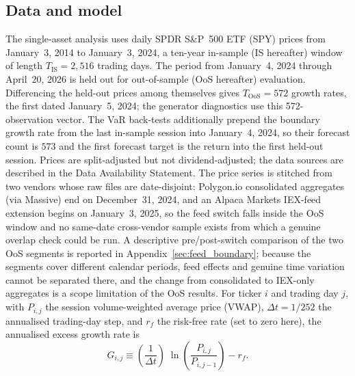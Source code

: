 \subsection{Data and model}
\label{sec:data_and_model}

The single-asset analysis uses daily SPDR S\&P~500 ETF (SPY) prices from January~3, 2014 to January~3, 2024, a ten-year in-sample (IS hereafter) window of length $T_{\text{IS}} = 2{,}516$ trading days. The period from January~4, 2024 through April~20, 2026 is held out for out-of-sample (OoS hereafter) evaluation. Differencing the held-out prices among themselves gives $T_{\text{OoS}} = 572$ growth rates, the first dated January~5, 2024; the generator diagnostics use this 572-observation vector. The VaR back-tests additionally prepend the boundary growth rate from the last in-sample session into January~4, 2024, so their forecast count is $573$ and the first forecast target is the return into the first held-out session. Prices are split-adjusted but not dividend-adjusted; the data sources are described in the Data Availability Statement. The price series is stitched from two vendors whose raw files are date-disjoint: Polygon.io consolidated aggregates (via Massive) end on December~31, 2024, and an Alpaca Markets IEX-feed extension begins on January~3, 2025, so the feed switch falls inside the OoS window and no same-date cross-vendor sample exists from which a genuine overlap check could be run. A descriptive pre/post-switch comparison of the two OoS segments is reported in Appendix~\ref{sec:feed_boundary}; because the segments cover different calendar periods, feed effects and genuine time variation cannot be separated there, and the change from consolidated to IEX-only aggregates is a scope limitation of the OoS results. For ticker $i$ and trading day $j$, with $P_{i,j}$ the session volume-weighted average price (VWAP), $\Delta t = 1/252$ the annualised trading-day step, and $r_f$ the risk-free rate (set to zero here), the annualised excess growth rate is
\begin{equation}
    G_{i,j} \equiv \left(\frac{1}{\Delta t}\right)\; \ln\!\left(\frac{P_{i,j}}{P_{i,j-1}}\right) - r_f.
    \label{eq:growth_rate}
\end{equation}
